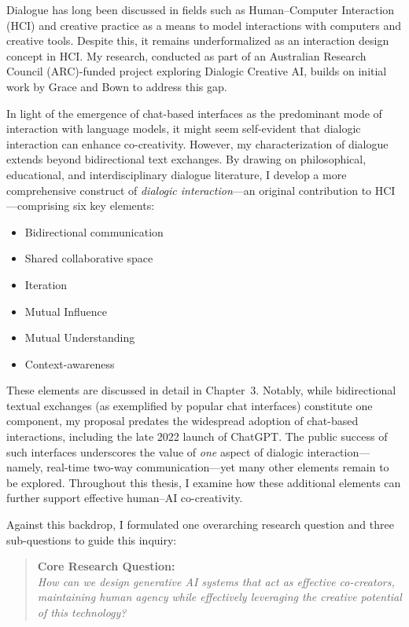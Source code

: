 Dialogue has long been discussed in fields such as Human--Computer Interaction (HCI) and creative practice as a means to model interactions with computers and creative tools. Despite this, it remains underformalized as an interaction design concept in HCI. My research, conducted as part of an Australian Research Council (ARC)-funded project exploring Dialogic Creative AI, builds on initial work by Grace and Bown to address this gap.

In light of the emergence of chat-based interfaces as the predominant mode of interaction with language models, it might seem self-evident that dialogic interaction can enhance co-creativity. However, my characterization of dialogue extends beyond bidirectional text exchanges. By drawing on philosophical, educational, and interdisciplinary dialogue literature, I develop a more comprehensive construct of \emph{dialogic interaction}---an original contribution to HCI---comprising six key elements:

\begin{itemize}
    \item Bidirectional communication
    \item Shared collaborative space
    \item Iteration
    \item Mutual Influence
    \item Mutual Understanding
    \item Context-awareness
\end{itemize}

These elements are discussed in detail in Chapter~3. Notably, while bidirectional textual exchanges (as exemplified by popular chat interfaces) constitute one component, my proposal predates the widespread adoption of chat-based interactions, including the late 2022 launch of ChatGPT. The public success of such interfaces underscores the value of \emph{one} aspect of dialogic interaction---namely, real-time two-way communication---yet many other elements remain to be explored. Throughout this thesis, I examine how these additional elements can further support effective human--AI co-creativity.

Against this backdrop, I formulated one overarching research question and three sub-questions to guide this inquiry:

\begin{quote}
\textbf{Core Research Question:}\\
\emph{How can we design generative AI systems that act as effective co-creators, maintaining human agency while effectively leveraging the creative potential of this technology?}
\end{quote}

